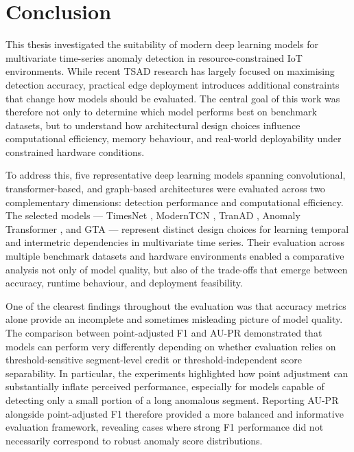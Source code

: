 \documentclass[twoside,11pt,openright]{report}
\begin{document}

\chapter{Conclusion}
\label{ch:conclusion}

This thesis investigated the suitability of modern deep learning models for
multivariate time-series anomaly detection in resource-constrained IoT
environments. While recent TSAD research has largely focused on maximising
detection accuracy, practical edge deployment introduces additional constraints
that change how models should be evaluated. The central goal of
this work was therefore not only to determine which model performs best on
benchmark datasets, but to understand how architectural design choices influence
computational efficiency, memory behaviour, and real-world deployability under
constrained hardware conditions.

To address this, five representative deep learning models spanning convolutional,
transformer-based, and graph-based architectures were evaluated across two
complementary dimensions: detection performance and computational efficiency.
The selected models — TimesNet \citep{timesnet2023}, ModernTCN \citep{moderntcn2024}, 
TranAD \citep{tranad2022}, Anomaly Transformer \citep{anomalytransformer2022}, and
GTA \citep{gta2022} — represent distinct design choices for learning temporal and
intermetric dependencies in multivariate time series. Their evaluation across
multiple benchmark datasets and hardware environments enabled a comparative
analysis not only of model quality, but also of the trade-offs that emerge
between accuracy, runtime behaviour, and deployment feasibility.

One of the clearest findings throughout the evaluation was that accuracy metrics
alone provide an incomplete and sometimes misleading picture of model quality.
The comparison between point-adjusted F1 and AU-PR demonstrated that models can
perform very differently depending on whether evaluation relies on
threshold-sensitive segment-level credit or threshold-independent score
separability. In particular, the experiments highlighted how point adjustment can
substantially inflate perceived performance, especially for models capable of
detecting only a small portion of a long anomalous segment. Reporting AU-PR
alongside point-adjusted F1 therefore provided a more balanced and informative
evaluation framework, revealing cases where strong F1 performance did not
necessarily correspond to robust anomaly score distributions.
\end{document}
